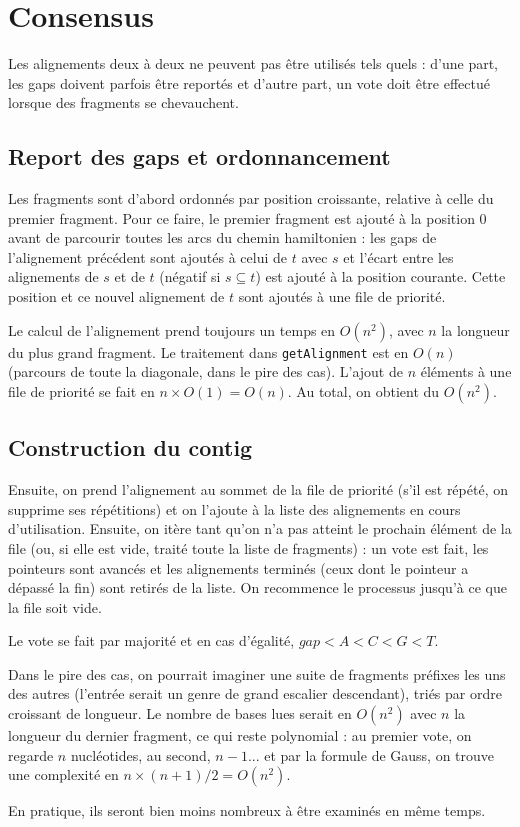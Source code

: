 \section{Consensus}
Les alignements deux à deux ne peuvent pas être utilisés tels quels :
d'une part, les gaps doivent parfois être reportés et
d'autre part, un vote doit être effectué lorsque des fragments se chevauchent.

\subsection{Report des gaps et ordonnancement}
Les fragments sont d'abord ordonnés par position croissante,
relative à celle du premier fragment.
Pour ce faire, le premier fragment est ajouté à la position 0 avant de
parcourir toutes les arcs  du chemin hamiltonien :
les gaps de l'alignement précédent sont ajoutés à celui de $t$ avec $s$ et
l'écart entre les alignements de $s$ et de $t$ (négatif si $s\subseteq t$) est
ajouté à la position courante. Cette position et ce nouvel alignement de $t$
sont ajoutés à une file de priorité.

Le calcul de l'alignement prend toujours un temps en $O(n^2)$, avec $n$ la
longueur du plus grand fragment. Le traitement dans \texttt{getAlignment}
est en $O(n)$ (parcours de toute la diagonale, dans le pire des cas).
L'ajout de $n$ éléments à une file de priorité se fait en $n\times O(1)=O(n)$.
Au total, on obtient du $O(n^2)$.

\subsection{Construction du contig}
Ensuite, on prend l'alignement au sommet de la file de priorité
(s'il est répété, on supprime ses répétitions) et on l'ajoute à
la liste des alignements en cours d'utilisation.
Ensuite, on itère tant qu'on n'a pas atteint le prochain élément de la file
(ou, si elle est vide, traité toute la liste de fragments) :
un vote est fait, les pointeurs sont avancés et les alignements terminés (ceux
dont le pointeur a dépassé la fin) sont retirés de la liste.
On recommence le processus jusqu'à ce que la file soit vide.

Le vote se fait par majorité et en cas d'égalité, $gap < A < C < G < T$.

Dans le pire des cas, on pourrait imaginer une suite de fragments préfixes les
uns des autres (l'entrée serait un genre de grand escalier descendant),
triés par ordre croissant de longueur. Le nombre de bases lues
serait en $O(n^2)$ avec $n$ la longueur du dernier fragment,
ce qui reste polynomial : au premier vote, on regarde $n$ nucléotides, au
second, $n-1$... et par la formule de Gauss, on trouve une complexité en
$n\times(n+1)/2=O(n^2)$.

En pratique, ils seront bien moins nombreux à être examinés en même temps.
